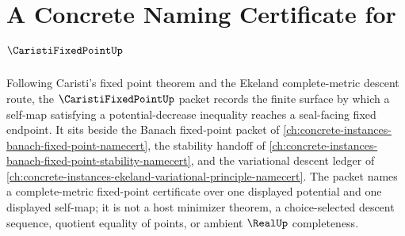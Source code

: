 \chapter{A Concrete Naming Certificate for $\CaristiFixedPointUp$}
\label{ch:concrete-instances-caristi-fixed-point-namecert}

Following Caristi's fixed point theorem and the Ekeland complete-metric descent route, the $\CaristiFixedPointUp$ packet records the finite surface by which a self-map satisfying a potential-decrease inequality reaches a seal-facing fixed endpoint. It sits beside the Banach fixed-point packet of \autoref{ch:concrete-instances-banach-fixed-point-namecert}, the stability handoff of \autoref{ch:concrete-instances-banach-fixed-point-stability-namecert}, and the variational descent ledger of \autoref{ch:concrete-instances-ekeland-variational-principle-namecert}. The packet names a complete-metric fixed-point certificate over one displayed potential and one displayed self-map; it is not a host minimizer theorem, a choice-selected descent sequence, quotient equality of points, or ambient $\RealUp$ completeness.

